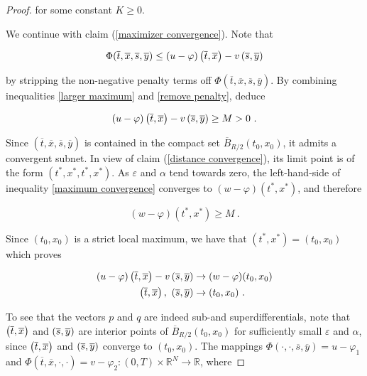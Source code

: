 \begin{lemma}
\begin{proof}
	 		for some constant $ K \geq 0 $.
	 		
	 		We continue with claim (\ref{maximizer convergence}). Note that
	 		
	 		\begin{equation}
	 		\label{remove penalty}
	 			\Phi(\overline{t}, \overline{x}, \overline{s}, \overline{y}) \leq
	 			(u - \varphi)\left(\overline{t}, \overline{x}\right) - v\left(\overline{s}, \overline{y}\right) 
	 		\end{equation}
	 		
	 		by stripping the non-negative penalty terms off $ \Phi(\overline{t}, \overline{x}, \overline{s}, \overline{y}) $. By combining inequalities \eqref{larger maximum} and \eqref{remove penalty}, deduce
	 		
	 		\begin{equation}
	 			\label{maximum convergence}
	 			(u - \varphi)\left(\overline{t}, \overline{x}\right) - v\left(\overline{s}, \overline{y}\right) \geq M > 0 \ .
	 		\end{equation}
	 		
	 		Since $ (\overline{t}, \overline{x}, \overline{s}, \overline{y}) $ is contained in the compact set $ \overline{B}_{R /2}(t_0, x_0) $, it admits a convergent subnet. In view of claim (\ref{distance convergence}), its limit point is of the form $ (t^{*}, x^{*}, t^{*}, x^{*})  $. As $ \varepsilon $ and  $ \alpha $ tend towards zero, the left-hand-side of inequality \eqref{maximum convergence} converges to $ (w - \varphi)(t^{*}, x^{*}) $, and therefore
	 		
	 		\begin{equation*}
	 			(w - \varphi)(t^{*}, x^{*}) \geq M \ .
	 		\end{equation*}
	 		
	 		Since $ (t_0, x_0) $ is a strict local maximum, we have that $ (t^{*}, x^{*})  = (t_0, x_0) $ which proves
	 		
	 		\begin{align*}
	 			(u - \varphi)\left(\overline{t}, \overline{x}\right) - v\left(\overline{s}, \overline{y}\right) &\to (w - \varphi)(t_0, x_0) \\
	 			\left(\overline{t}, \overline{x}\right), \ \left(\overline{s}, \overline{y}\right) &\to (t_0, x_0) \ .
	 		\end{align*}
	 		
	 		To see that the vectors $ p $ and $ q $ are indeed sub-and superdifferentials,  note that $ \left(\overline{t}, \overline{x}\right) $ and $ \left(\overline{s}, \overline{y}\right) $ are interior points of $ \overline{B}_{R / 2}(t_0, x_0) $ for sufficiently small $ \varepsilon $ and $ \alpha $, since $ \left(\overline{t}, \overline{x}\right) $ and $ \left(\overline{s}, \overline{y}\right) $ converge to $ (t_0, x_0) $. The mappings $ \Phi(\cdot, \cdot, \overline{s}, \overline{y}) = u - \varphi_1 $ and $ \Phi(\overline{t}, \overline{x}, \cdot, \cdot) =  v - \varphi_2 : \left( 0, T \right) \times \mathbb{R}^N \to \mathbb{R} $, where
	 		

\end{proof}
\end{lemma}
